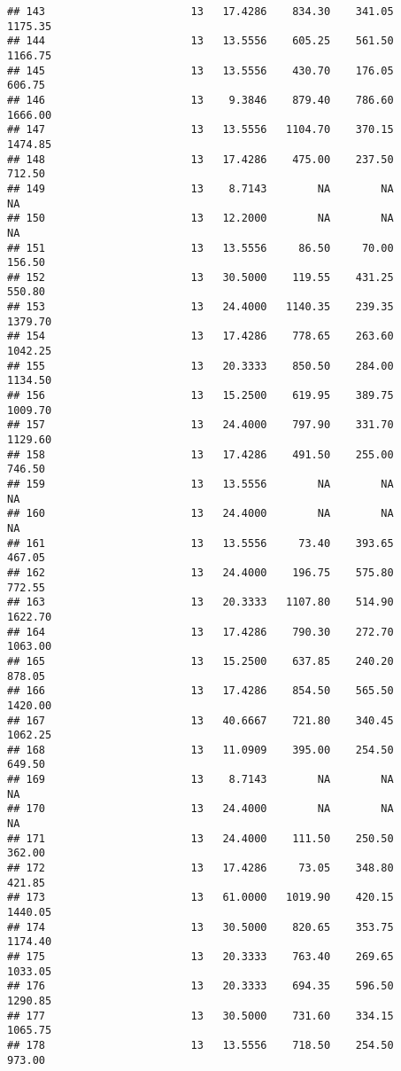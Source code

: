 \documentclass[]{article}
\begin{document}
\begin{verbatim}
## 143                       13   17.4286    834.30    341.05    1175.35
## 144                       13   13.5556    605.25    561.50    1166.75
## 145                       13   13.5556    430.70    176.05     606.75
## 146                       13    9.3846    879.40    786.60    1666.00
## 147                       13   13.5556   1104.70    370.15    1474.85
## 148                       13   17.4286    475.00    237.50     712.50
## 149                       13    8.7143        NA        NA         NA
## 150                       13   12.2000        NA        NA         NA
## 151                       13   13.5556     86.50     70.00     156.50
## 152                       13   30.5000    119.55    431.25     550.80
## 153                       13   24.4000   1140.35    239.35    1379.70
## 154                       13   17.4286    778.65    263.60    1042.25
## 155                       13   20.3333    850.50    284.00    1134.50
## 156                       13   15.2500    619.95    389.75    1009.70
## 157                       13   24.4000    797.90    331.70    1129.60
## 158                       13   17.4286    491.50    255.00     746.50
## 159                       13   13.5556        NA        NA         NA
## 160                       13   24.4000        NA        NA         NA
## 161                       13   13.5556     73.40    393.65     467.05
## 162                       13   24.4000    196.75    575.80     772.55
## 163                       13   20.3333   1107.80    514.90    1622.70
## 164                       13   17.4286    790.30    272.70    1063.00
## 165                       13   15.2500    637.85    240.20     878.05
## 166                       13   17.4286    854.50    565.50    1420.00
## 167                       13   40.6667    721.80    340.45    1062.25
## 168                       13   11.0909    395.00    254.50     649.50
## 169                       13    8.7143        NA        NA         NA
## 170                       13   24.4000        NA        NA         NA
## 171                       13   24.4000    111.50    250.50     362.00
## 172                       13   17.4286     73.05    348.80     421.85
## 173                       13   61.0000   1019.90    420.15    1440.05
## 174                       13   30.5000    820.65    353.75    1174.40
## 175                       13   20.3333    763.40    269.65    1033.05
## 176                       13   20.3333    694.35    596.50    1290.85
## 177                       13   30.5000    731.60    334.15    1065.75
## 178                       13   13.5556    718.50    254.50     973.00

\end{verbatim}
\end{document}
